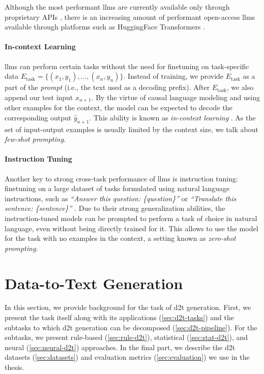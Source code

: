 {Although the most performant \acp{llm} are currently available only through proprietary APIs \cite{chatgpt,openai2023gpt4,team2023gemini,anthropic2024claude}, there is an increasing amount of performant open-access \acp{llm} \cite{jiangMistral7B2023,touvronLlamaOpenFoundation2023} available through platforms such as HuggingFace Transformers \cite{wolf2019HuggingFacesTS}.

\paragraph{In-context Learning} \acp{llm} can perform certain tasks without the need for finetuning on task-specific data $E_{\text{task}} = \{(x_1, y_1), \ldots, (x_n, y_n)\}$. Instead of training, we provide $E_{\text{task}}$ as a part of the \emph{prompt} (i.e., the text used as a decoding prefix). After $E_{\text{task}}$, we also append our test input $x_{n+1}$. By the virtue of causal language modeling and using other examples for the context, the model can be expected to decode the corresponding output $\hat{y}_{n+1}$. This ability is known as \emph{in-context learning} \cite{brown2020language,dong2022survey}. As the set of input-output examples is usually limited by the context size, we talk about \emph{few-shot prompting}.

\paragraph{Instruction Tuning} Another key to strong cross-task performance of \acp{llm} is instruction tuning: finetuning on a large dataset of tasks formulated using natural language instructions, such as \textit{``Answer this question: \{question\}''} or \textit{``Translate this sentence: \{sentence\}''} \cite{sanh2021multitask,ouyang2022TrainingLM}. Due to their strong generalization abilities, the instruction-tuned models can be prompted to perform a task of choice in natural language, even without being directly trained for it. This allows to use the model for the task with no examples in the context, a setting known as \emph{zero-shot prompting}.



\section{Data-to-Text Generation}
\label{sec:d2t}
In this section, we provide background for the task of \acl{d2t} generation. First, we present the task itself along with its applications (\autoref{sec:d2t-tasks}) and the subtasks to which \ac{d2t} generation can be decomposed (\autoref{sec:d2t-pipeline}). For the subtasks, we present rule-based (\autoref{sec:rule-d2t}), statistical (\autoref{sec:stat-d2t}), and neural (\autoref{sec:neural-d2t}) approaches. In the final part, we describe the \ac{d2t} datasets (\autoref{sec:datasets}) and evaluation metrics (\autoref{sec:evaluation}) we use in the thesis.

}
